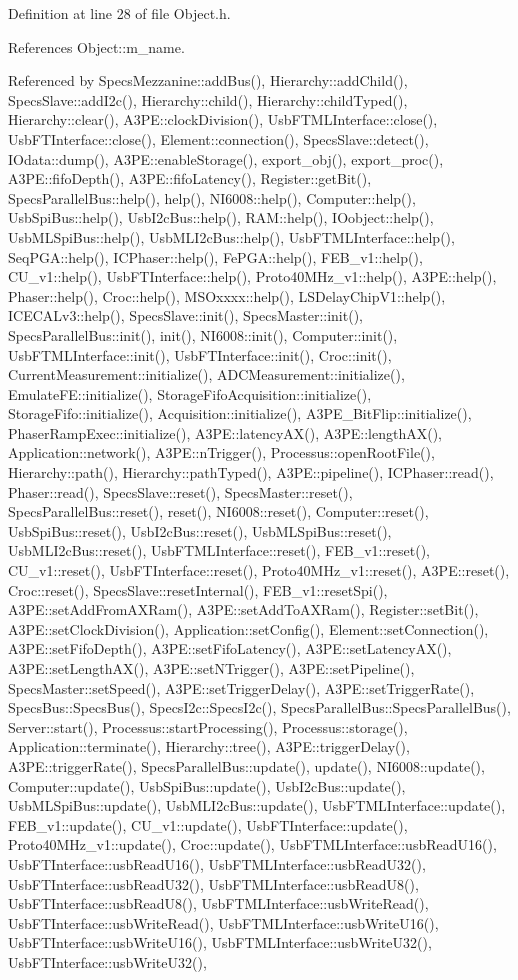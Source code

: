 Definition at line 28 of file Object.h.

References Object::m\_\-name.

Referenced by SpecsMezzanine::addBus(), Hierarchy::addChild(), SpecsSlave::addI2c(), Hierarchy::child(), Hierarchy::childTyped(), Hierarchy::clear(), A3PE::clockDivision(), UsbFTMLInterface::close(), UsbFTInterface::close(), Element::connection(), SpecsSlave::detect(), IOdata::dump(), A3PE::enableStorage(), export\_\-obj(), export\_\-proc(), A3PE::fifoDepth(), A3PE::fifoLatency(), Register::getBit(), SpecsParallelBus::help(), help(), NI6008::help(), Computer::help(), UsbSpiBus::help(), UsbI2cBus::help(), RAM::help(), IOobject::help(), UsbMLSpiBus::help(), UsbMLI2cBus::help(), UsbFTMLInterface::help(), SeqPGA::help(), ICPhaser::help(), FePGA::help(), FEB\_\-v1::help(), CU\_\-v1::help(), UsbFTInterface::help(), Proto40MHz\_\-v1::help(), A3PE::help(), Phaser::help(), Croc::help(), MSOxxxx::help(), LSDelayChipV1::help(), ICECALv3::help(), SpecsSlave::init(), SpecsMaster::init(), SpecsParallelBus::init(), init(), NI6008::init(), Computer::init(), UsbFTMLInterface::init(), UsbFTInterface::init(), Croc::init(), CurrentMeasurement::initialize(), ADCMeasurement::initialize(), EmulateFE::initialize(), StorageFifoAcquisition::initialize(), StorageFifo::initialize(), Acquisition::initialize(), A3PE\_\-BitFlip::initialize(), PhaserRampExec::initialize(), A3PE::latencyAX(), A3PE::lengthAX(), Application::network(), A3PE::nTrigger(), Processus::openRootFile(), Hierarchy::path(), Hierarchy::pathTyped(), A3PE::pipeline(), ICPhaser::read(), Phaser::read(), SpecsSlave::reset(), SpecsMaster::reset(), SpecsParallelBus::reset(), reset(), NI6008::reset(), Computer::reset(), UsbSpiBus::reset(), UsbI2cBus::reset(), UsbMLSpiBus::reset(), UsbMLI2cBus::reset(), UsbFTMLInterface::reset(), FEB\_\-v1::reset(), CU\_\-v1::reset(), UsbFTInterface::reset(), Proto40MHz\_\-v1::reset(), A3PE::reset(), Croc::reset(), SpecsSlave::resetInternal(), FEB\_\-v1::resetSpi(), A3PE::setAddFromAXRam(), A3PE::setAddToAXRam(), Register::setBit(), A3PE::setClockDivision(), Application::setConfig(), Element::setConnection(), A3PE::setFifoDepth(), A3PE::setFifoLatency(), A3PE::setLatencyAX(), A3PE::setLengthAX(), A3PE::setNTrigger(), A3PE::setPipeline(), SpecsMaster::setSpeed(), A3PE::setTriggerDelay(), A3PE::setTriggerRate(), SpecsBus::SpecsBus(), SpecsI2c::SpecsI2c(), SpecsParallelBus::SpecsParallelBus(), Server::start(), Processus::startProcessing(), Processus::storage(), Application::terminate(), Hierarchy::tree(), A3PE::triggerDelay(), A3PE::triggerRate(), SpecsParallelBus::update(), update(), NI6008::update(), Computer::update(), UsbSpiBus::update(), UsbI2cBus::update(), UsbMLSpiBus::update(), UsbMLI2cBus::update(), UsbFTMLInterface::update(), FEB\_\-v1::update(), CU\_\-v1::update(), UsbFTInterface::update(), Proto40MHz\_\-v1::update(), Croc::update(), UsbFTMLInterface::usbReadU16(), UsbFTInterface::usbReadU16(), UsbFTMLInterface::usbReadU32(), UsbFTInterface::usbReadU32(), UsbFTMLInterface::usbReadU8(), UsbFTInterface::usbReadU8(), UsbFTMLInterface::usbWriteRead(), UsbFTInterface::usbWriteRead(), UsbFTMLInterface::usbWriteU16(), UsbFTInterface::usbWriteU16(), UsbFTMLInterface::usbWriteU32(), UsbFTInterface::usbWriteU32(), 